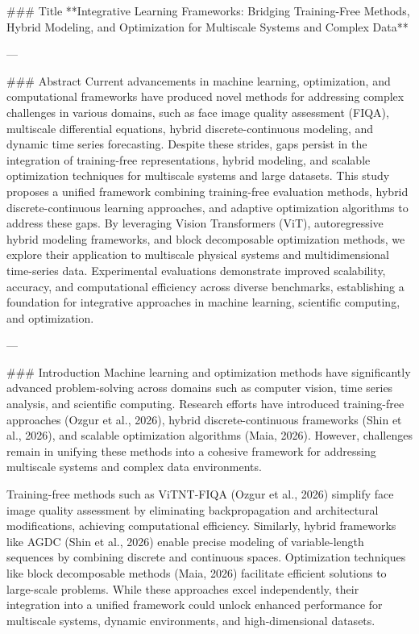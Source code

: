 ### Title  
**Integrative Learning Frameworks: Bridging Training-Free Methods, Hybrid Modeling, and Optimization for Multiscale Systems and Complex Data**

---

### Abstract  
Current advancements in machine learning, optimization, and computational frameworks have produced novel methods for addressing complex challenges in various domains, such as face image quality assessment (FIQA), multiscale differential equations, hybrid discrete-continuous modeling, and dynamic time series forecasting. Despite these strides, gaps persist in the integration of training-free representations, hybrid modeling, and scalable optimization techniques for multiscale systems and large datasets. This study proposes a unified framework combining training-free evaluation methods, hybrid discrete-continuous learning approaches, and adaptive optimization algorithms to address these gaps. By leveraging Vision Transformers (ViT), autoregressive hybrid modeling frameworks, and block decomposable optimization methods, we explore their application to multiscale physical systems and multidimensional time-series data. Experimental evaluations demonstrate improved scalability, accuracy, and computational efficiency across diverse benchmarks, establishing a foundation for integrative approaches in machine learning, scientific computing, and optimization.  

---

### Introduction  
Machine learning and optimization methods have significantly advanced problem-solving across domains such as computer vision, time series analysis, and scientific computing. Research efforts have introduced training-free approaches (Ozgur et al., 2026), hybrid discrete-continuous frameworks (Shin et al., 2026), and scalable optimization algorithms (Maia, 2026). However, challenges remain in unifying these methods into a cohesive framework for addressing multiscale systems and complex data environments.

Training-free methods such as ViTNT-FIQA (Ozgur et al., 2026) simplify face image quality assessment by eliminating backpropagation and architectural modifications, achieving computational efficiency. Similarly, hybrid frameworks like AGDC (Shin et al., 2026) enable precise modeling of variable-length sequences by combining discrete and continuous spaces. Optimization techniques like block decomposable methods (Maia, 2026) facilitate efficient solutions to large-scale problems. While these approaches excel independently, their integration into a unified framework could unlock enhanced performance for multiscale systems, dynamic environments, and high-dimensional datasets.

